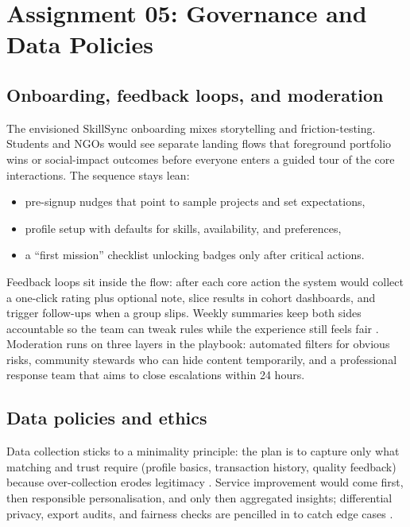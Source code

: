 \section*{Assignment 05: Governance and Data Policies}

\subsection*{Onboarding, feedback loops, and moderation}
The envisioned SkillSync onboarding mixes storytelling and friction-testing. Students and NGOs would see separate landing flows that foreground portfolio wins or social-impact outcomes before everyone enters a guided tour of the core interactions. The sequence stays lean:
\begin{itemize}
  \item pre-signup nudges that point to sample projects and set expectations,
  \item profile setup with defaults for skills, availability, and preferences,
  \item a ``first mission'' checklist unlocking badges only after critical actions.
\end{itemize}

Feedback loops sit inside the flow: after each core action the system would collect a one-click rating plus optional note, slice results in cohort dashboards, and trigger follow-ups when a group slips. Weekly summaries keep both sides accountable so the team can tweak rules while the experience still feels fair \citep{Reillier2017}. Moderation runs on three layers in the playbook: automated filters for obvious risks, community stewards who can hide content temporarily, and a professional response team that aims to close escalations within 24 hours.

\subsection*{Data policies and ethics}
Data collection sticks to a minimality principle: the plan is to capture only what matching and trust require (profile basics, transaction history, quality feedback) because over-collection erodes legitimacy \citep{Zuboff2019}. Service improvement would come first, then responsible personalisation, and only then aggregated insights; differential privacy, export audits, and fairness checks are pencilled in to catch edge cases \citep{Srnicek2017}.

